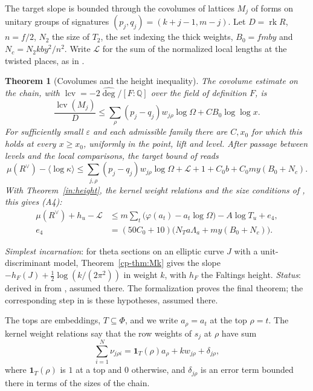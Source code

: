 \documentclass[reqno]{amsart}
\theoremstyle{definition}
\theoremstyle{plain}
\newtheorem{theorem}{Theorem}[section]
\newcommand{\lcv}{\operatorname{lcv}}
\newcommand{\Q}{\mathbb{Q}}
\begin{document}
The target slope is bounded through the covolumes of lattices $M_j$ of
forms on unitary groups of signatures $(p_j,q_j)=(k+j-1,m-j)$.
Let $D=\operatorname{rk} R$, $n=f/2$, $N_2$ the size of $T_2$, the set indexing the thick weights, $B_0=fmby$ and $N_c=N_2kby^2/n^2$.
Write $\mathcal L$ for the sum of the normalized local lengths at the
twisted places, as in \cite[\S15.4]{Adr}.

\begin{theorem}[Covolumes and the height inequality]\label{in:A4}
The covolume estimate on the chain, with $\lcv=-2\widehat{\deg}/[F:\Q]$ over the field of definition $F$, is
\[
 \frac{\lcv(M_j)}D\le
 \sum_{\rho}(p_j-q_j)w_{j\rho}\log\Omega+C B_0\log\log x .
\]
For sufficiently small $\varepsilon$ and each admissible family there are
$C,x_0$ for which this holds at every $x\ge x_0$, uniformly in the
point, lift and level.  After passage between levels and the local
comparisons, the target bound of \cite[Hyp.~15.16]{Adr} reads
\[
 \mu(R^\vee)-\langle\log\kappa\rangle
 \le \sum_{j,\rho}(p_j-q_j)w_{j\rho}\log\Omega+\mathcal L
       +1+C_0 b+C_0my(B_0+N_c).
\]
With Theorem~\ref{in:height}, the kernel weight relations and the size
conditions of \cite[Hyp.~15.18, Thm.~15.19]{Adr}, this gives (A4):
\begin{align*}
 \mu(R^\vee)+h_u-\mathcal L
   &\le m\sum_t\bigl(\varphi(a_t)-a_t\log\Omega\bigr)-A\log T_u+e_4,\\
 e_4&=(50C_0+10)\bigl(N_Ta\Lambda_a+my(B_0+N_c)\bigr).
\end{align*}
\end{theorem}
\noindent\emph{Simplest incarnation}: for theta sections on an elliptic curve $J$ with
a unit-discriminant model, Theorem~\ref{cp-thm:Mk} gives the slope
$-h_F(J)+\tfrac12\log(k/(2\pi^2))$ in weight $k$, with $h_F$
the Faltings height.  \emph{Status}: derived in \cite[Thms.~15.19
and~15.70]{Adr} from \cite[Hyps.~15.10--15.12, 15.16, 15.18,
15.58--15.59 and~15.69]{Adr}, assumed there.  The formalization proves
the final theorem; the corresponding step in \cite{Adr} is these
hypotheses, assumed there.

The tops are embeddings, $T\subseteq\Phi$, and we write $a_\rho=a_t$ at the
top $\rho=t$.  The kernel weight relations \cite[Hyp.~15.18]{Adr} say that
the row weights of $s_j$ at $\rho$ have sum
\[
 \sum_{i=1}^N\nu_{j\rho i}=\mathbf1_T(\rho)a_\rho+kw_{j\rho}+\delta_{j\rho},
\]
where $\mathbf1_T(\rho)$ is $1$ at a top and $0$ otherwise, and $\delta_{j\rho}$
is an error term bounded there in terms of the sizes of the chain.
\end{document}
